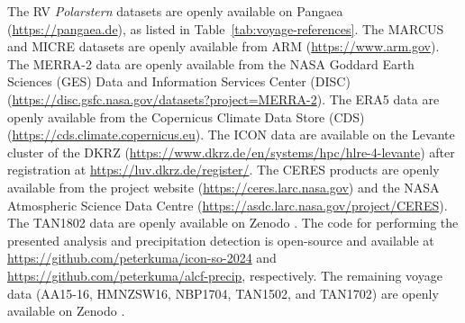 \documentclass[draft]{agujournal2019}
\begin{document}
The RV \emph{Polarstern} datasets are openly available on Pangaea (\url{https://pangaea.de}), as listed in Table~\ref{tab:voyage-references}. The MARCUS and MICRE datasets are openly available from ARM (\url{https://www.arm.gov}). The MERRA-2 data are openly available from the NASA Goddard Earth Sciences (GES) Data and Information Services Center (DISC) (\url{https://disc.gsfc.nasa.gov/datasets?project=MERRA-2}). The ERA5 data are openly available from the Copernicus Climate Data Store (CDS) (\url{https://cds.climate.copernicus.eu}). The ICON data are available on the Levante cluster of the DKRZ (\url{https://www.dkrz.de/en/systems/hpc/hlre-4-levante}) after registration at \url{https://luv.dkrz.de/register/}. The CERES products are openly available from the project website (\url{https://ceres.larc.nasa.gov}) and the NASA Atmospheric Science Data Centre (\url{https://asdc.larc.nasa.gov/project/CERES}). The TAN1802 data are openly available on Zenodo \cite{kremser2020}. The code for performing the presented analysis and precipitation detection is open-source and available at \url{https://github.com/peterkuma/icon-so-2024} and \url{https://github.com/peterkuma/alcf-precip}, respectively. The remaining voyage data (AA15-16, HMNZSW16, NBP1704, TAN1502, and TAN1702) are openly available on Zenodo \cite{mcdonald2024b}.

\acknowledgments
\end{document}
